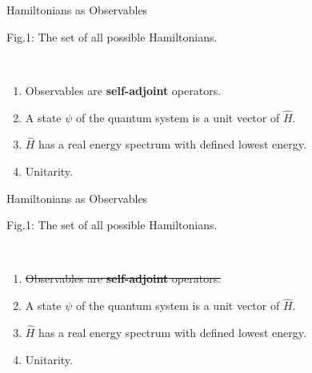\documentclass[10pt]{beamer}
\begin{document}
\begin{frame}{Hamiltonians as Observables}
    \\
    \hspace{1em}
    \begin{tiny}
        Fig.1: The set of all possible Hamiltonians.
    \end{tiny}
    \\
    \begin{enumerate}
        \item \textcolor{myNewColorA}{Observables are \textbf{self-adjoint} operators.}
        \item \textcolor{myNewColorC}{A state $\psi$ of the quantum system is a unit vector of $\hat{H}$.}
        \item \textcolor{myNewColorC}{$\hat{H}$ has a real energy spectrum with defined lowest energy.}
        \item \textcolor{myNewColorC}{Unitarity.}
    \end{enumerate}
\end{frame}


\begin{frame}{Hamiltonians as Observables}
    \\
    \hspace{1em}
    \begin{tiny}
        Fig.1: The set of all possible Hamiltonians.
    \end{tiny}
    \\
    \begin{enumerate}
        \item \textcolor{myNewColorA}{\st{Observables are \textbf{self-adjoint} operators.}}
        \item \textcolor{myNewColorC}{A state $\psi$ of the quantum system is a unit vector of $\hat{H}$.}
        \item \textcolor{myNewColorC}{$\hat{H}$ has a real energy spectrum with defined lowest energy.}
        \item \textcolor{myNewColorC}{Unitarity.}
    \end{enumerate}
\end{frame}
\end{document}
